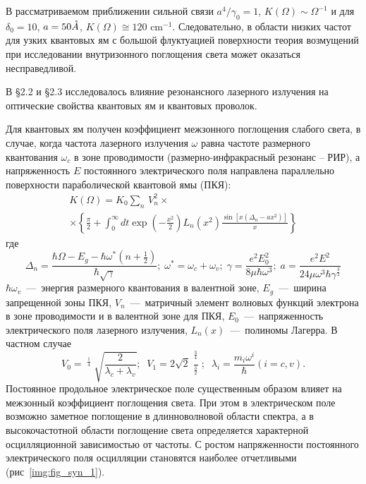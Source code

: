 В рассматриваемом приближении сильной связи $a^4 /\gamma_0 =1$, $K(\Omega )\sim \Omega ^{-1} $ и для $\delta_0 =10$, $a=50 \AA$, $K(\Omega )\cong 120 \text{ cm}^{-1} $. Следовательно, в области низких частот для узких квантовых ям с большой флуктуацией поверхности теория возмущений при исследовании внутризонного поглощения света может оказаться несправедливой.

В §2.2 и §2.3 исследовалось влияние резонансного лазерного излучения на оптические свойства квантовых ям и квантовых проволок.

Для квантовых ям получен коэффициент межзонного поглощения слабого света, в случае, когда частота лазерного излучения $\omega $ равна частоте размерного квантования $\omega_c $ в зоне проводимости (размерно-инфракрасный резонанс -- РИР), а напряженность $E$ постоянного электрического поля направлена параллельно поверхности параболической квантовой ямы (ПКЯ): 
\begin{multline} \label{eq:syn_11} 
K(\Omega )=K_0 \sum _{n} \, V_n^2 \times  \\
\times \left\{\frac{\pi }{2} +\int_0^{\infty } dt \exp \left(-\frac{x^2 }{2} \right)L_n \left(x^2 \right)\frac{\sin \left[x\left(\Delta_n - a x^2 \right)\right]}{x} \right\}
\end{multline} 
где 
\[
\Delta_n =\frac{\hbar \Omega -E_g -\hbar \omega^* \left(n+{\tfrac{1}{2}} \right)}{\hbar \sqrt{\gamma } } ; \; \omega^* =\omega_c +\omega_v ; \; \gamma =\frac{e^2 E_0^2 }{8 \mu \hbar \omega^3 }; \; a=\frac{e^2 E^2 }{2 4\mu \omega^3 \hbar \gamma^{\tfrac{3}{2}}}
\] 
$\hbar \omega_v $~---~энергия размерного квантования в валентной зоне, $E_g$~---~ширина запрещенной зоны ПКЯ, $V_n$~---~матричный элемент волновых функций электрона в зоне проводимости и в валентной зоне для ПКЯ, $E_0$~---~напряженность электрического поля лазерного излучения, $L_n(x)$~---~полиномы Лагерра. В частном случае 
\[V_0 =\mathop{\left(\lambda_c \lambda_v \right)}\nolimits^{{\tfrac{1}{4}} } \sqrt{\frac{2}{\lambda_c +\lambda_v } } ;\; \; V_1 =2\sqrt{2} \frac{\mathop{\left(\lambda_c \lambda_v \right)}\nolimits^{{\tfrac{3}{4}} } }{\mathop{\left(\lambda_c +\lambda_v \right)}\nolimits^{{\tfrac{3}{2}} } } ;\; \; \lambda_i =\frac{m_i \omega^i }{\hbar } (i=c,v).\] 
Постоянное продольное электрическое поле существенным образом влияет на межзонный коэффициент поглощения света. При этом в электрическом поле возможно заметное поглощение в длинноволновой области спектра, а в высокочастотной области поглощение света определяется характерной осцилляционной зависимостью от частоты. С ростом напряженности постоянного электрического поля осцилляции становятся наиболее отчетливыми (рис~\ref{img:fig_syn_1}).

